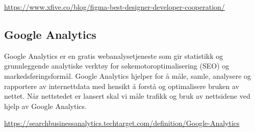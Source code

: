 \url{https://www.xfive.co/blog/figma-best-designer-developer-cooperation/}

\subsection{ Google Analytics}
Google Analytics er en gratis webanalysetjeneste som gir statistikk og grunnleggende analytiske verktøy for søkemotoroptimalisering (SEO) og markedsføringsformål. Google Analytics hjelper for å måle, samle, analysere og rapportere av internettdata med hensikt å forstå og optimalisere bruken av nettet.
Når nettstedet er lansert skal vi måle trafikk og bruk av nettsidene ved hjelp av Google Analytics.

\url{https://searchbusinessanalytics.techtarget.com/definition/Google-Analytics}

\clearpage